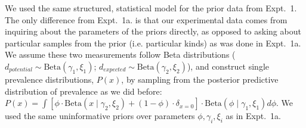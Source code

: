 \documentclass[12pt,letterpaper]{article}
\newcommand{\ndg}[1]{\textcolor{Green}{[ndg: #1]}}
\begin{document}
We used the same structured, statistical model for the prior data from Expt.~1.
The only difference from Expt.~1a. is that our experimental data comes from inquiring about the parameters of the priors directly, as opposed to asking about particular samples from the prior (i.e. particular kinds) as was done in Expt.~1a. 
We assume these two measurements follow Beta distributions ($d_{potential} \sim \text{Beta}(\gamma_{1}, \xi_{1})$; $
d_{expected} \sim \text{Beta}(\gamma_{2}, \xi_{2})$), and construct single prevalence distributions, $P(x)$, by sampling from the posterior predictive distribution of prevalence as we did before: $P(x) = \int [ \phi\cdot \text{Beta} (x \mid \gamma_{2}, \xi_{2}) + (1 -  \phi) \cdot \delta_{x=0} ] \cdot \text{Beta}(\phi \mid \gamma_{1}, \xi_{1}) d\phi$.
We used the same uninformative priors over parameters $\phi, \gamma_{i}, \xi_{i}$ as in Expt.~1a.
%
%
\end{document}
